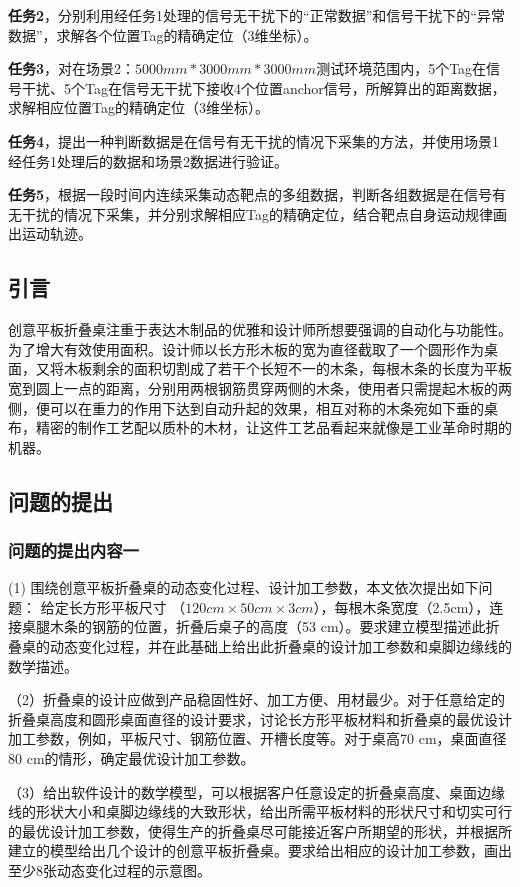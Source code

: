 \documentclass[bwprint]{gmcmthesis}
\begin{document}
\textbf{任务2}，分别利用经任务1处理的信号无干扰下的“正常数据”和信号干扰下的“异常数据”，求解各个位置Tag的精确定位（3维坐标）。

\textbf{任务3}，对在场景2：$5000mm*3000mm*3000mm$测试环境范围内，5个Tag在信号干扰、5个Tag在信号无干扰下接收4个位置anchor信号，所解算出的距离数据，求解相应位置Tag的精确定位（3维坐标）。

\textbf{任务4}，提出一种判断数据是在信号有无干扰的情况下采集的方法，并使用场景1经任务1处理后的数据和场景2数据进行验证。

\textbf{任务5}，根据一段时间内连续采集动态靶点的多组数据，判断各组数据是在信号有无干扰的情况下采集，并分别求解相应Tag的精确定位，结合靶点自身运动规律画出运动轨迹。

\subsection{引言}
创意平板折叠桌注重于表达木制品的优雅和设计师所想要强调的自动化与功能性。为了增大有效使用面积。设计师以长方形木板的宽为直径截取了一个圆形作为桌面，又将木板剩余的面积切割成了若干个长短不一的木条，每根木条的长度为平板宽到圆上一点的距离，分别用两根钢筋贯穿两侧的木条，使用者只需提起木板的两侧，便可以在重力的作用下达到自动升起的效果，相互对称的木条宛如下垂的桌布，精密的制作工艺配以质朴的木材，让这件工艺品看起来就像是工业革命时期的机器。

\subsection{问题的提出}

\subsubsection{问题的提出内容一}

(1) 围绕创意平板折叠桌的动态变化过程、设计加工参数，本文依次提出如下问题：
给定长方形平板尺寸 （$120 cm \times 50 cm \times 3 cm$），每根木条宽度（2.5cm），连接桌腿木条的钢筋的位置，折叠后桌子的高度（53 cm）。要求建立模型描述此折叠桌的动态变化过程，并在此基础上给出此折叠桌的设计加工参数和桌脚边缘线的数学描述。

（2）折叠桌的设计应做到产品稳固性好、加工方便、用材最少。对于任意给定的折叠桌高度和圆形桌面直径的设计要求，讨论长方形平板材料和折叠桌的最优设计加工参数，例如，平板尺寸、钢筋位置、开槽长度等。对于桌高70 cm，桌面直径80 cm的情形，确定最优设计加工参数。

（3）给出软件设计的数学模型，可以根据客户任意设定的折叠桌高度、桌面边缘线的形状大小和桌脚边缘线的大致形状，给出所需平板材料的形状尺寸和切实可行的最优设计加工参数，使得生产的折叠桌尽可能接近客户所期望的形状，并根据所建立的模型给出几个设计的创意平板折叠桌。要求给出相应的设计加工参数，画出至少8张动态变化过程的示意图。
\end{document}
